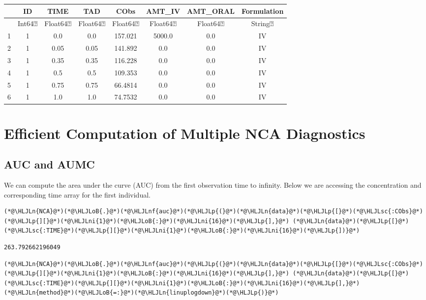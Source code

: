 \documentclass[12pt,a4paper]{article}
\newcommand{\HLJLn}[1]{#1}
\newcommand{\HLJLnf}[1]{\textcolor[RGB]{66,102,213}{#1}}
\newcommand{\HLJLsc}[1]{\textcolor[RGB]{201,61,57}{#1}}
\newcommand{\HLJLni}[1]{\textcolor[RGB]{59,151,46}{#1}}
\newcommand{\HLJLoB}[1]{\textcolor[RGB]{102,102,102}{\textbf{#1}}}
\newcommand{\HLJLp}[1]{#1}
\begin{document}
\begin{tabular}{r|ccccccc}
	& ID & TIME & TAD & CObs & AMT\_IV & AMT\_ORAL & Formulation\\
	\hline
	& Int64⍰ & Float64⍰ & Float64⍰ & Float64⍰ & Float64⍰ & Float64⍰ & String⍰\\
	\hline
	1 & 1 & 0.0 & 0.0 & 157.021 & 5000.0 & 0.0 & IV \\
	2 & 1 & 0.05 & 0.05 & 141.892 & 0.0 & 0.0 & IV \\
	3 & 1 & 0.35 & 0.35 & 116.228 & 0.0 & 0.0 & IV \\
	4 & 1 & 0.5 & 0.5 & 109.353 & 0.0 & 0.0 & IV \\
	5 & 1 & 0.75 & 0.75 & 66.4814 & 0.0 & 0.0 & IV \\
	6 & 1 & 1.0 & 1.0 & 74.7532 & 0.0 & 0.0 & IV \\
\end{tabular}


\section{Efficient Computation of Multiple NCA Diagnostics}
\subsection{AUC and AUMC}
We can compute the area under the curve (AUC) from the first observation time to infinity. Below we are accessing the concentration and corresponding time array for the first individual.


\begin{lstlisting}
(*@\HLJLn{NCA}@*)(*@\HLJLoB{.}@*)(*@\HLJLnf{auc}@*)(*@\HLJLp{(}@*)(*@\HLJLn{data}@*)(*@\HLJLp{[}@*)(*@\HLJLsc{:CObs}@*)(*@\HLJLp{][}@*)(*@\HLJLni{1}@*)(*@\HLJLoB{:}@*)(*@\HLJLni{16}@*)(*@\HLJLp{],}@*) (*@\HLJLn{data}@*)(*@\HLJLp{[}@*)(*@\HLJLsc{:TIME}@*)(*@\HLJLp{][}@*)(*@\HLJLni{1}@*)(*@\HLJLoB{:}@*)(*@\HLJLni{16}@*)(*@\HLJLp{])}@*)
\end{lstlisting}

\begin{lstlisting}
263.792662196049
\end{lstlisting}


\begin{lstlisting}
(*@\HLJLn{NCA}@*)(*@\HLJLoB{.}@*)(*@\HLJLnf{auc}@*)(*@\HLJLp{(}@*)(*@\HLJLn{data}@*)(*@\HLJLp{[}@*)(*@\HLJLsc{:CObs}@*)(*@\HLJLp{][}@*)(*@\HLJLni{1}@*)(*@\HLJLoB{:}@*)(*@\HLJLni{16}@*)(*@\HLJLp{],}@*) (*@\HLJLn{data}@*)(*@\HLJLp{[}@*)(*@\HLJLsc{:TIME}@*)(*@\HLJLp{][}@*)(*@\HLJLni{1}@*)(*@\HLJLoB{:}@*)(*@\HLJLni{16}@*)(*@\HLJLp{],}@*) (*@\HLJLn{method}@*)(*@\HLJLoB{=:}@*)(*@\HLJLn{linuplogdown}@*)(*@\HLJLp{)}@*)
\end{lstlisting}
\end{document}

